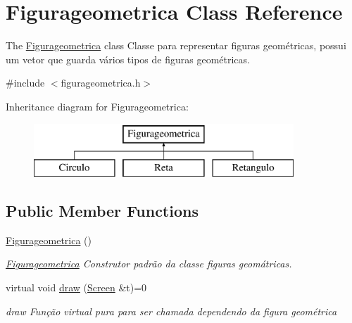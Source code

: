\hypertarget{class_figurageometrica}{}\section{Figurageometrica Class Reference}
\label{class_figurageometrica}


The \mbox{\hyperlink{class_figurageometrica}{Figurageometrica}} class Classe para representar figuras geométricas, possui um vetor que guarda vários tipos de figuras geométricas.  




{\ttfamily \#include $<$figurageometrica.\+h$>$}

Inheritance diagram for Figurageometrica\+:\begin{figure}[H]
\begin{center}
\leavevmode
\includegraphics[height=2.000000cm]{class_figurageometrica}
\end{center}
\end{figure}
\subsection*{Public Member Functions}
\begin{DoxyCompactItemize}
\item 
\mbox{\label{class_figurageometrica_aaa6a63e714e6ee3e884d17a5151b1ec4}} 
\mbox{\hyperlink{class_figurageometrica_aaa6a63e714e6ee3e884d17a5151b1ec4}{Figurageometrica}} ()
\begin{DoxyCompactList}\small\item\em \mbox{\hyperlink{class_figurageometrica}{Figurageometrica}} Construtor padrão da classe figuras geomátricas. \end{DoxyCompactList}\item 
virtual void \mbox{\hyperlink{class_figurageometrica_a68d9aba508879bb7a9ea1fe9d1d4f5f4}{draw}} (\mbox{\hyperlink{class_screen}{Screen}} \&t)=0
\begin{DoxyCompactList}\small\item\em draw Função virtual pura para ser chamada dependendo da figura geométrica \end{DoxyCompactList}\end{DoxyCompactItemize}
